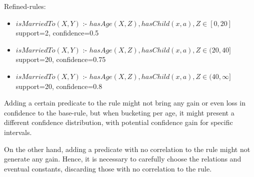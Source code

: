 Refined-rules:
\begin{itemize}
 \item $isMarriedTo(X,Y)$ :- $hasAge(X,Z),hasChild(x,a), Z\in[0,20]$	
    \newline support=2, confidence=0.5
 \item $isMarriedTo(X,Y)$ :- $hasAge(X,Z),hasChild(x,a), Z\in(20,40]$	
    \newline support=20, confidence=0.75
 \item $isMarriedTo(X,Y)$ :- $hasAge(X,Z),hasChild(x,a), Z\in(40,\infty]$	
    \newline support=20, confidence=0.8
\end{itemize}

\begin{figure}
\label{fig:addingHasChildExample}

\end{figure}

Adding a certain predicate to the rule might not bring any gain or even loss in confidence to the base-rule, but when
bucketing per age, it might present a different confidence distribution, with potential confidence gain for specific
intervals.

On the other hand, adding a predicate with no correlation to the rule might not generate any gain. Hence, it is
necessary to carefully choose the relations and eventual constants, discarding those with no correlation to the rule.  

